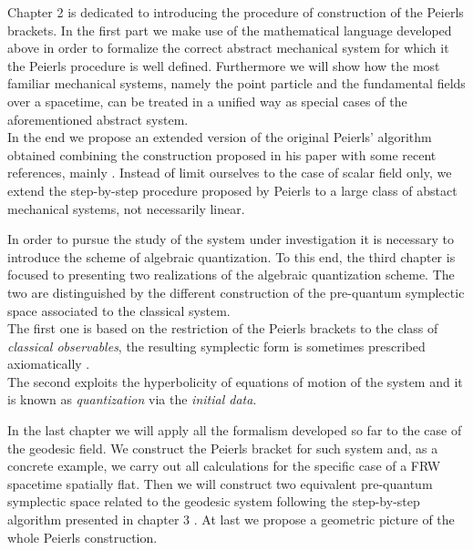 \documentclass[Main]{subfiles}
\begin{document}
Chapter 2 is dedicated to introducing the procedure of construction of the Peierls brackets.
In the first part we make use of the mathematical language developed above in order to formalize the correct abstract mechanical system for which it the Peierls procedure is well defined. Furthermore we will show how the most familiar mechanical systems, namely the point particle and the fundamental fields over a spacetime, can be treated in a unified way as special cases of the aforementioned abstract system.
\\
In the end we propose an extended version of the original Peierls' algorithm obtained combining the construction proposed in his paper\cite{Peierls1952} with some recent references, mainly \cite{Marolf1993}\cite{Dewitt1999}\cite{Forger2005}\cite{Sharan2010}\cite{Khavkine2014}.
Instead of limit ourselves to the case of scalar field only, we extend the step-by-step procedure proposed by Peierls to a large class of abstact mechanical systems, not necessarily linear.

In order to pursue the study of the system under investigation it is necessary to introduce the scheme of algebraic quantization.
To this end, the third chapter is focused to presenting two realizations of the algebraic quantization scheme.
The two are distinguished by the different construction of the pre-quantum symplectic space associated to the classical system.
\\
The first one is based on the restriction of the Peierls brackets to the class of \emph{classical observables}, the resulting symplectic form is sometimes prescribed axiomatically \cite{Dewitt1999}\cite{Esposito}\cite{Benini}.\\
The second exploits the hyperbolicity of equations of motion of the system and it is known as \emph{quantization} via the \emph{initial data}\cite{Wald1994}.

In the last chapter we will apply all the formalism developed so far to the case of the geodesic field.
We construct the Peierls bracket for such system and, as a  concrete example, we carry out all calculations for the specific case of a FRW spacetime spatially flat.
Then we will construct two equivalent pre-quantum symplectic space related to the geodesic system following the step-by-step algorithm presented in chapter 3 .
At last we propose a geometric picture of the whole Peierls construction.
\end{document}
